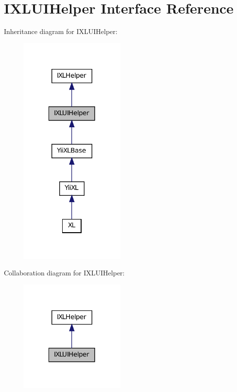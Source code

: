 \hypertarget{interfaceIXLUIHelper}{
\section{IXLUIHelper Interface Reference}
\label{interfaceIXLUIHelper}
}


Inheritance diagram for IXLUIHelper:\nopagebreak
\begin{figure}[H]
\begin{center}
\leavevmode
\includegraphics[width=150pt]{interfaceIXLUIHelper__inherit__graph}
\end{center}
\end{figure}


Collaboration diagram for IXLUIHelper:\nopagebreak
\begin{figure}[H]
\begin{center}
\leavevmode
\includegraphics[width=150pt]{interfaceIXLUIHelper__coll__graph}
\end{center}
\end{figure}
